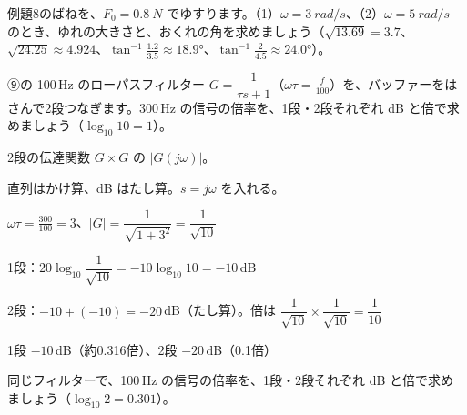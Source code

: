 \begin{jibun}
例題8のばねを、$F_0=\qty{0.8}{N}$ でゆすります。（1）\nobreak $\omega=\qty{3}{rad/s}$、（2）\nobreak $\omega=\qty{5}{rad/s}$ のとき、ゆれの大きさと、おくれの角を求めましょう（$\sqrt{13.69}=3.7$、$\sqrt{24.25}\approx4.924$、$\tan^{-1}\frac{1.2}{3.5}\approx18.9°$、$\tan^{-1}\frac{2}{4.5}\approx24.0°$）。
\end{jibun}

\begin{reidai}[2段のフィルターを dB で]
⑨の 100\,Hz のローパスフィルター $G=\dfrac{1}{\tau s+1}$（$\omega\tau=\frac{f}{100}$）を、バッファーをはさんで2段つなぎます。300\,Hz の信号の倍率を、1段・2段それぞれ dB と倍で求めましょう（$\log_{10}10=1$）。\par
\kangaekata {}\par
{}\enspace 2段の伝達関数 $G\times G$ の $|G(j\omega)|$。\par
{}\enspace 直列はかけ算、dB はたし算。$s=j\omega$ を入れる。\par
\shiki\kixis{}\zw{} $\omega\tau=\frac{300}{100}=3$、$|G|=\dfrac{1}{\sqrt{1+3^2}}=\dfrac{1}{\sqrt{10}}$\par
\kixia 1段：$20\log_{10}\dfrac{1}{\sqrt{10}}=-10\log_{10}10=-10$\,dB\par
\kixia 2段：$-10+(-10)=-20$\,dB（たし算）。倍は $\dfrac{1}{\sqrt{10}}\times\dfrac{1}{\sqrt{10}}=\dfrac{1}{10}$\par
\kotae 1段 $-10$\,dB（約0.316倍）、2段 $-20$\,dB（0.1倍）
\end{reidai}

\begin{jibun}
同じフィルターで、100\,Hz の信号の倍率を、1段・2段それぞれ dB と倍で求めましょう（$\log_{10}2=0.301$）。
\end{jibun}

